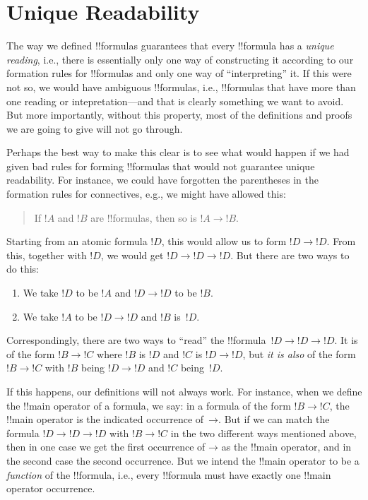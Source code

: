 \documentclass[10pt,a4paper]{article}
\theoremstyle{plain}
\theoremstyle{definition}
\theoremstyle{remark}
\newenvironment{explain}{}{}
\newcommand*{\olfileid}[3]{}
\newcommand*{\olsection}[1]{\section*{#1}}
\providecommand{\lif}{\mathbin{\rightarrow}}
\begin{document}



\olfileid{fol}{syn}{unq}

\olsection{Unique Readability}

\begin{explain}
The way we defined !!{formula}s guarantees that every !!{formula} has
a \emph{unique reading}, i.e., there is essentially only one way of
constructing it according to our formation rules for !!{formula}s and
only one way of ``interpreting'' it.  If this were not so, we would
have ambiguous !!{formula}s, i.e., !!{formula}s that have more than
one reading or intepretation---and that is clearly something we want
to avoid.  But more importantly, without this property, most of the
definitions and proofs we are going to give will not go through.

Perhaps the best way to make this clear is to see what would happen if
we had given bad rules for forming !!{formula}s that would not
guarantee unique readability.  For instance, we could have forgotten
the parentheses in the formation rules for connectives, e.g., we might
have allowed this:
\begin{quote}
If $!A$ and $!B$ are !!{formula}s, then so is $!A \lif !B$.
\end{quote}
Starting from an atomic formula $!D$, this would allow us to form $!D
\lif !D$. From this, together with $!D$, we would get $!D \lif !D
\lif !D$.  But there are two ways to do this:
\begin{enumerate}
\item We take $!D$ to be $!A$ and $!D \lif !D$ to be $!B$.
\item We take $!A$ to be $!D \lif !D$ and $!B$ is~$!D$.  
\end{enumerate}
Correspondingly, there are two ways to
``read'' the !!{formula}~$!D \lif !D \lif !D$. It is of the form $!B
\lif !C$ where $!B$ is $!D$ and $!C$ is $!D \lif !D$, but \emph{it is
  also} of the form $!B \lif !C$ with $!B$ being $!D \lif !D$ and $!C$
being~$!D$.

If this happens, our definitions will not always work. For instance,
when we define the !!{main operator} of a formula, we say: in a
formula of the form $!B \lif !C$, the !!{main operator} is the
indicated occurrence of~$\lif$. But if we can match the formula $!D
\lif !D \lif !D$ with $!B \lif !C$ in the two different ways mentioned
above, then in one case we get the first occurrence of $\lif$ as the
!!{main operator}, and in the second case the second occurrence.  But
we intend the !!{main operator} to be a \emph{function} of the
!!{formula}, i.e., every !!{formula} must have exactly one !!{main
  operator} occurrence.
\end{explain}
\end{document}
